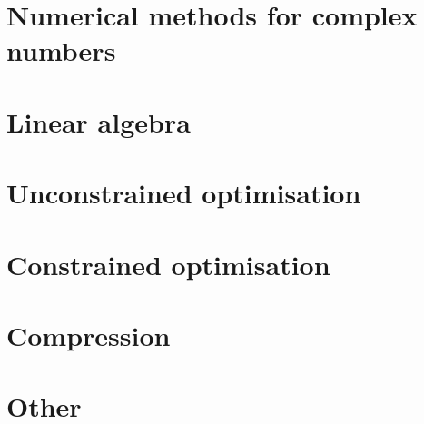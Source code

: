\documentclass[oneside]{book}
\begin{document}
\part{Numerical methods for complex numbers}


\part{Linear algebra}









\part{Unconstrained optimisation}





\part{Constrained optimisation}


\part{Compression}


\part{Other}


\end{document}
